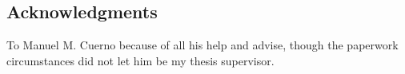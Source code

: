 \subsection*{Acknowledgments}
To Manuel M. Cuerno because of all his help and advise, though the paperwork circumstances did not let him be my thesis supervisor.
